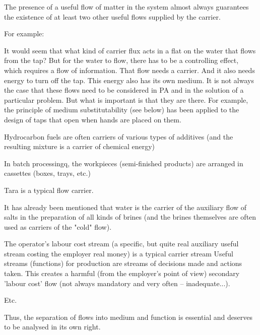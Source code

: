 \documentclass[a4paper,11pt]{article}
\begin{document}
The presence of a useful flow of matter in the system almost always guarantees
the existence of at least two other useful flows supplied by the carrier.

For example:

It would seem that what kind of carrier flux acts in a flat on the water that
flows from the tap? But for the water to flow, there has to be a controlling
effect, which requires a flow of information. That flow needs a carrier. And
it also needs energy to turn off the tap. This energy also has its own medium.
It is not always the case that these flows need to be considered in PA and in
the solution of a particular problem. But what is important is that they are
there. For example, the principle of medium substitutability (see below) has
been applied to the design of taps that open when hands are placed on them.

Hydrocarbon fuels are often carriers of various types of additives (and the
resulting mixture is a carrier of chemical energy)

In batch processingq, the workpieces (semi-finished products) are arranged in cassettes (boxes, trays, etc.)

Tara is a typical flow carrier.

It has already been mentioned that water is the carrier of the auxiliary flow
of salts in the preparation of all kinds of brines (and the brines themselves
are often used as carriers of the "cold" flow).

The operator's labour cost stream (a specific, but quite real auxiliary useful
stream costing the employer real money) is a typical carrier stream Useful
streams (functions) for production are streams of decisions made and actions
taken. This creates a harmful (from the employer's point of view) secondary
'labour cost' flow (not always mandatory and very often -- inadequate...).

Etc.

Thus, the separation of flows into medium and function is essential and
deserves to be analysed in its own right.
\end{document}
